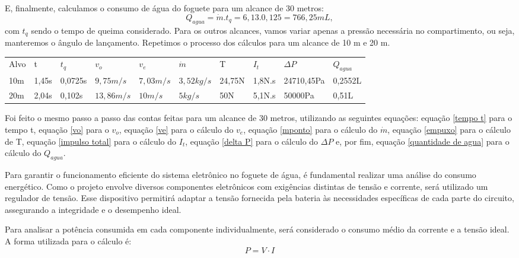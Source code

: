 E, finalmente, calculamos o consumo de água do foguete para um alcance de 30 metros:
\begin{equation}
    Q_{agua}=\dot{m}.t_q= 6,13.0,125=766,25mL ,
    \label{quantidade de agua}
\end{equation}
com \(t_q\) sendo o tempo de queima considerado.
Para os outros alcances, vamos variar apenas a pressão necessária no compartimento, ou seja, manteremos o ângulo de lançamento. Repetimos o processo dos cálculos para um alcance de 10 m e 20 m.


\begin{table}[h!]
\begin{tabular}{llllllllll}
Alvo & t  & $t_q$ & $v_o$   & $v_e$    & $\dot{m}$ & T & $I_t$ & $\Delta P$ & $Q_{agua}$ \\
10m     & 1,45s               & 0,0725s            & $9,75m/s$  & $7,03m/s$ & $3,52kg/s$                 & 24,75N      & 1,8N.s               & 24710,45Pa            & 0,2552L               \\
20m     & 2,04s               & 0,102s            & $13,86m/s$ & $10m/s$ & $5kg/s$                 & 50N        & 5,1N.s               & 50000Pa            & 0,51L             
\end{tabular}
\end{table}


Foi feito o mesmo passo a passo das contas feitas para um alcance de 30 metros, utilizando as seguintes equações: equação \ref{tempo t} para o tempo t, equação \ref{vo} para o \(v_o\), equação \ref{ve} para o cálculo do \(v_e\), equação \ref{mponto} para o cálculo do \(\dot{m}\), equação \ref{empuxo} para o cálculo de T, equação \ref{impulso total} para o cálculo do \(I_t\), equação \ref{delta P} para o cálculo do \(\Delta P\) e, por fim, equação \ref{quantidade de agua} para o cálculo do \(Q_{agua}\).

 Para garantir o funcionamento eficiente do sistema eletrônico no foguete de água, é fundamental realizar uma análise do consumo energético. 	Como o projeto envolve diversos componentes eletrônicos com exigências distintas de tensão e corrente, será utilizado um regulador de tensão. Esse dispositivo permitirá adaptar a tensão fornecida pela bateria às necessidades específicas de cada parte do circuito, assegurando a integridade e o desempenho ideal. 

 Para  analisar a potência consumida em cada componente individualmente, será considerado o consumo médio da corrente e a tensão ideal. A forma utilizada para o cálculo é:
 \begin{equation}
     P = V \cdot I 
 \end{equation}

